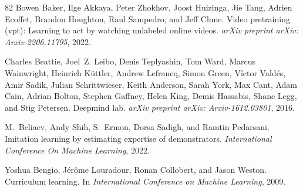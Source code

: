 \documentclass{article}
\begin{document}
\begin{thebibliography}{82}
Bowen Baker, Ilge Akkaya, Peter Zhokhov, Joost Huizinga, Jie Tang, Adrien Ecoffet, Brandon Houghton, Raul Sampedro, and Jeff Clune.
\newblock Video pretraining (vpt): Learning to act by watching unlabeled online videos.
\newblock \emph{arXiv preprint arXiv: Arxiv-2206.11795}, 2022.

Charles Beattie, Joel~Z. Leibo, Denis Teplyashin, Tom Ward, Marcus Wainwright, Heinrich Küttler, Andrew Lefrancq, Simon Green, Víctor Valdés, Amir Sadik, Julian Schrittwieser, Keith Anderson, Sarah York, Max Cant, Adam Cain, Adrian Bolton, Stephen Gaffney, Helen King, Demis Hassabis, Shane Legg, and Stig Petersen.
\newblock Deepmind lab.
\newblock \emph{arXiv preprint arXiv: Arxiv-1612.03801}, 2016.

M.~Beliaev, Andy Shih, S.~Ermon, Dorsa Sadigh, and Ramtin Pedarsani.
\newblock Imitation learning by estimating expertise of demonstrators.
\newblock \emph{International Conference On Machine Learning}, 2022.

Yoshua Bengio, J{\'e}r{\^o}me Louradour, Ronan Collobert, and Jason Weston.
\newblock Curriculum learning.
\newblock In \emph{International Conference on Machine Learning}, 2009.


\end{thebibliography}
\end{document}
